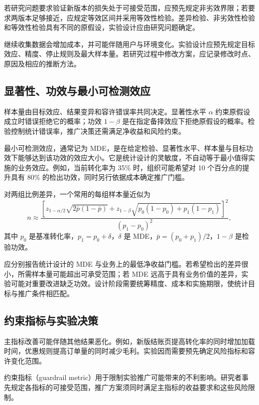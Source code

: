 若研究问题要求验证新版本的损失处于可接受范围，应预先规定非劣效界限；若要求两版本足够接近，应规定等效区间并采用等效性检验。差异检验、非劣效性检验和等效性检验具有不同的原假设，实验设计应由研究问题确定。

继续收集数据会增加成本，并可能伴随用户与环境变化。实验设计应预先规定目标效应、精度、停止规则及最大样本量。若研究过程中修改方案，应记录修改时点、原因及相应的推断方法。

\subsection{显著性、功效与最小可检测效应}

样本量由目标效应、结果变异和容许错误率共同决定。显著性水平 \(\alpha\) 约束原假设成立时错误拒绝它的概率；功效 \(1-\beta\) 是在指定备择效应下拒绝原假设的概率。检验控制统计错误率，推广决策还需满足净收益和风险约束。

最小可检测效应，通常记为 MDE，是在给定检验、显著性水平、样本量与目标功效下能够达到该功效的效应大小。它是统计设计的灵敏度，不自动等于最小值得实施的业务效应。例如，当前转化率为 35\% 时，组织可能希望对 10 个百分点的提升具有 80\% 的检出功效，同时另行依据成本确定推广门槛。

对两组比例差异，一个常用的每组样本量近似为
\[
n
\approx
\frac{
\left[
z_{1-\alpha/2}\sqrt{2\bar p(1-\bar p)}
+
z_{1-\beta}\sqrt{p_0(1-p_0)+p_1(1-p_1)}
\right]^2
}{
(p_1-p_0)^2
},
\]
其中 \(p_0\) 是基准转化率，\(p_1=p_0+\delta\)，\(\delta\) 是 MDE，\(\bar p=(p_0+p_1)/2\)，\(1-\beta\) 是检验功效。

\begin{modernbox}[管理解释]
应分别报告统计设计的 MDE 与业务上的最低净收益门槛。若希望检出的差异很小，所需样本量可能超出可承受范围；若 MDE 远高于具有业务价值的差异，实验可能对重要改进缺乏功效。设计阶段需要统筹精度、成本和实施期限，使统计目标与推广条件相匹配。
\end{modernbox}

\subsection{约束指标与实验决策}

主指标改善可能伴随其他结果恶化。例如，新版结账页提高转化率的同时增加加载时间，优惠规则提高订单量的同时减少毛利。实验因而需要预先确定风险指标和容许变化范围。

\begin{definition}[约束指标]
约束指标（guardrail metric）用于限制实验推广可能带来的不利影响。研究者事先规定各指标的可接受范围，推广方案须同时满足主指标的收益要求和这些风险限制。
\end{definition}


